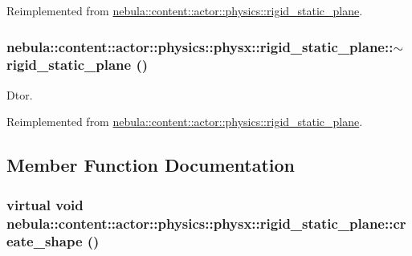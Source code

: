 Reimplemented from \hyperlink{classnebula_1_1content_1_1actor_1_1physics_1_1rigid__static__plane_a1d27dcdd2e2648e8296620dbdd05388e}{nebula::content::actor::physics::rigid\_\-static\_\-plane}.\hypertarget{classnebula_1_1content_1_1actor_1_1physics_1_1physx_1_1rigid__static__plane_a0a2b698c6355ef43fce8ede0c1859519}{
\subsubsection[{$\sim$rigid\_\-static\_\-plane}]{\setlength{\rightskip}{0pt plus 5cm}nebula::content::actor::physics::physx::rigid\_\-static\_\-plane::$\sim$rigid\_\-static\_\-plane ()}}
\label{classnebula_1_1content_1_1actor_1_1physics_1_1physx_1_1rigid__static__plane_a0a2b698c6355ef43fce8ede0c1859519}


Dtor. 

Reimplemented from \hyperlink{classnebula_1_1content_1_1actor_1_1physics_1_1rigid__static__plane_a961a69e85f5169130857f5ad9dd135fd}{nebula::content::actor::physics::rigid\_\-static\_\-plane}.

\subsection{Member Function Documentation}
\hypertarget{classnebula_1_1content_1_1actor_1_1physics_1_1physx_1_1rigid__static__plane_a20338f07330b2d7565d0b75732e68d09}{
\subsubsection[{create\_\-shape}]{\setlength{\rightskip}{0pt plus 5cm}virtual void nebula::content::actor::physics::physx::rigid\_\-static\_\-plane::create\_\-shape ()}}
\label{classnebula_1_1content_1_1actor_1_1physics_1_1physx_1_1rigid__static__plane_a20338f07330b2d7565d0b75732e68d09}



